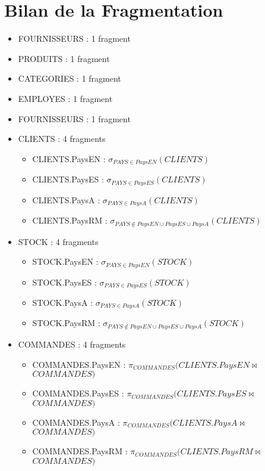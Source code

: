 \documentclass[10pt,a4paper,twoside]{article}
\begin{document}
\section{Bilan de la Fragmentation}
\begin{itemize}
\item FOURNISSEURS : 1 fragment
\item PRODUITS : 1 fragment
\item CATEGORIES : 1 fragment
\item EMPLOYES : 1 fragment
\item FOURNISSEURS : 1 fragment
\item CLIENTS : 4 fragments
\begin{itemize}
\item CLIENTS.PaysEN : $\sigma_{PAYS \in PaysEN}(CLIENTS)$
\item CLIENTS.PaysES : $\sigma_{PAYS \in PaysES}(CLIENTS)$
\item CLIENTS.PaysA : $\sigma_{PAYS \in PaysA}(CLIENTS)$
\item CLIENTS.PaysRM : $\sigma_{PAYS \not\in PaysEN \cup PaysES \cup PaysA}(CLIENTS)$
\end{itemize}
\item STOCK : 4 fragments
\begin{itemize}
\item STOCK.PaysEN : $\sigma_{PAYS \in PaysEN}(STOCK)$
\item STOCK.PaysES : $\sigma_{PAYS \in PaysES}(STOCK)$
\item STOCK.PaysA : $\sigma_{PAYS \in PaysA}(STOCK)$
\item STOCK.PaysRM : $\sigma_{PAYS \not\in PaysEN \cup PaysES \cup PaysA}(STOCK)$
\end{itemize}
\item COMMANDES : 4 fragments
\begin{itemize}
\item COMMANDES.PaysEN : $\pi_{COMMANDES}(CLIENTS.PaysEN \bowtie$\\
 $COMMANDES)$
\item COMMANDES.PaysES : $\pi_{COMMANDES}(CLIENTS.PaysES \bowtie$\\
 $COMMANDES)$
\item COMMANDES.PaysA : $\pi_{COMMANDES}(CLIENTS.PaysA \bowtie$\\
 $COMMANDES)$
\item COMMANDES.PaysRM : $\pi_{COMMANDES}(CLIENTS.PaysRM \bowtie$\\
 $COMMANDES)$
\end{itemize}

\end{itemize}
\end{document}
